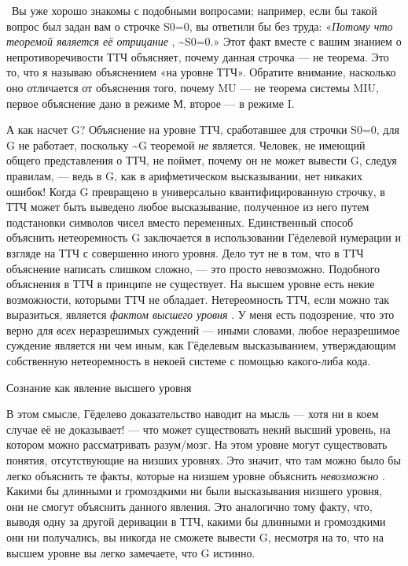 \documentclass[../main.tex]{subfiles}
\begin{document}
~Вы уже хорошо знакомы с подобными вопросами; например, если бы такой вопрос был задан вам о строчке S0=0, вы ответили бы без труда: «\emph{Потому что теоремой является её отрицание} , \textasciitilde S0=0.» Этот факт вместе с вашим знанием о непротиворечивости ТТЧ объясняет, почему данная строчка --- не теорема. Это то, что я называю объяснением «на уровне ТТЧ». Обратите внимание, насколько оно отличается от объяснения того, почему MU --- не теорема системы MIU, первое объяснение дано в режиме М, второе --- в режиме I.

А как насчет G? Объяснение на уровне ТТЧ, сработавшее для строчки S0=0, для G не работает, поскольку \textasciitilde G теоремой \emph{не} является. Человек, не имеющий общего представления о ТТЧ, не поймет, почему он не может вывести G, следуя правилам, --- ведь в G, как в арифметическом высказывании, нет никаких ошибок! Когда G превращено в универсально квантифицированную строчку, в ТТЧ может быть выведено любое высказывание, полученное из него путем подстановки символов чисел вместо переменных. Единственный способ объяснить нетеоремность G заключается в использовании Гёделевой нумерации и взгляде на ТТЧ с совершенно иного уровня. Дело тут не в том, что в ТТЧ объяснение написать слишком сложно, --- это просто невозможно. Подобного объяснения в ТТЧ в принципе не существует. На высшем уровне есть некие возможности, которыми ТТЧ не обладает. Нетереомность ТТЧ, если можно так выразиться, является \emph{фактом высшего уровня} . У меня есть подозрение, что это верно для \emph{всех} неразрешимых суждений --- иными словами, любое неразрешимое суждение является ни чем иным, как Гёделевым высказыванием, утверждающим собственную нетеоремность в некоей системе с помощью какого-либа кода.

Сознание как явление высшего уровня

В этом смысле, Гёделево доказательство наводит на мысль --- хотя ни в коем случае её не доказывает! --- что может существовать некий высший уровень, на котором можно рассматривать разум/мозг. На этом уровне могут существовать понятия, отсутствующие на низших уровнях. Это значит, что там можно было бы легко объяснить те факты, которые на низшем уровне объяснить \emph{невозможно} . Какими бы длинными и громоздкими ни были высказывания низшего уровня, они не смогут объяснить данного явления. Это аналогично тому факту, что, выводя одну за другой деривации в ТТЧ, какими бы длинными и громоздкими они ни получались, вы никогда не сможете вывести G, несмотря на то, что на высшем уровне вы легко замечаете, что G истинно.
\end{document}
